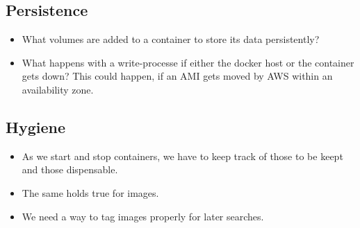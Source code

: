 \documentclass[captions=tableheading]{article}
\begin{document}
\subsection{Persistence}
\label{sec-9-3}

\begin{itemize}
\item What volumes are added to a container to store its data persistently?
\item What happens with a write-processe if either the docker host or the container gets down? This could happen, if an AMI gets moved by AWS within an availability zone.
\end{itemize}
\subsection{Hygiene}
\label{sec-9-4}

\begin{itemize}
\item As we start and stop containers, we have to keep track of those to be keept and those dispensable.
\item The same holds true for images.
\item We need a way to tag images properly for later searches.
\end{itemize}
\end{document}
